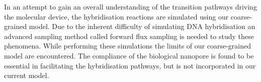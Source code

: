 \newpage

In an attempt to gain an overall understanding of the transition pathways driving the
molecular device, the hybridisation reactions are simulated using our coarse-grained
model. Due to the inherent difficulty of simulating DNA hybridisation an advanced
sampling method called forward flux sampling is needed to study these phenomena.
While performing these simulations the limits of our coarse-grained model are
encountered. The compliance of the biological nanopore is found to be essential in
facilitating the hybridisation pathways, but is not incorporated in our current model.

\cleardoublepage
